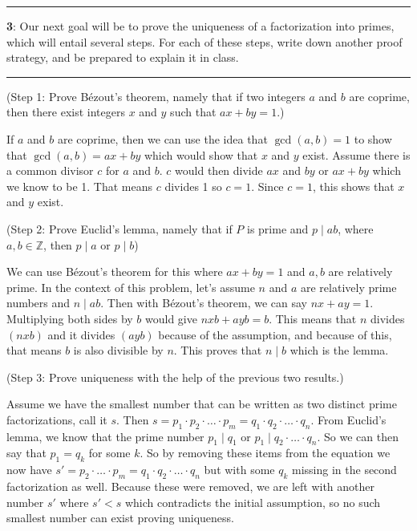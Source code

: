 \documentclass[11pt]{article}
\newcommand\question[2]{\vspace{.25in}\hrule\textbf{#1}: #2\vspace{.5em}\hrule\vspace{.10in}}
\renewcommand\part[1]{\vspace{.10in}(#1)\par}
\newcommand{\Z}{\mathbb{Z}}
\begin{document}
\question{3}{Our next goal will be to prove the uniqueness of a factorization into primes, which will entail several steps. For each of these steps, write down another proof strategy, and be prepared to explain it in class.}

\part{Step 1: Prove Bézout's theorem, namely that if two integers $a$ and $b$ are coprime, then there exist integers $x$ and $y$ such that $ax+by=1$.}

If $a$ and $b$ are coprime, then we can use the idea that $\gcd(a,b) = 1$ to show that $\gcd(a,b) = ax+by$ which would show that $x$ and $y$ exist. Assume there is a common divisor $c$ for $a$ and $b$. $c$ would then divide $ax$ and $by$ or $ax + by$ which we know to be 1. That means $c$ divides 1 so $c=1$. Since $c=1$, this shows that $x$ and $y$ exist.

\part{Step 2: Prove Euclid's lemma, namely that if $P$ is prime and $p \mid ab$, where $a,b \in \Z$, then $p \mid a$ or $p \mid b$}

We can use Bézout's theorem for this where $ax + by = 1$ and $a,b$ are relatively prime. In the context of this problem, let's assume $n$ and $a$ are relatively prime numbers and $n \mid ab$. Then with Bézout's theorem, we can say $nx + ay = 1$. Multiplying both sides by $b$ would give $nxb + ayb = b$. This means that $n$ divides $(nxb)$ and it divides $(ayb)$ because of the assumption, and because of this, that means $b$ is also divisible by $n$. This proves that $n \mid b$ which is the lemma.

\part{Step 3: Prove uniqueness with the help of the previous two results.}

Assume we have the smallest number that can be written as two distinct prime factorizations, call it $s$. Then $s = p_1 \cdot p_2 \cdot \ldots \cdot p_m = q_1 \cdot q_2 \cdot \ldots \cdot q_n$. From Euclid's lemma, we know that the prime number $p_1 \mid q_1$ or $p_1 \mid q_2 \cdot \ldots \cdot q_n$. So we can then say that $p_1 = q_k$ for some $k$. So by removing these items from the equation we now have $s' = p_2 \cdot \ldots \cdot p_m = q_1 \cdot q_2 \cdot \ldots \cdot q_n$ but with some $q_k$ missing in the second factorization as well. Because these were removed, we are left with another number $s'$ where $s' < s$ which contradicts the initial assumption, so no such smallest number can exist proving uniqueness.

	
\end{document}
